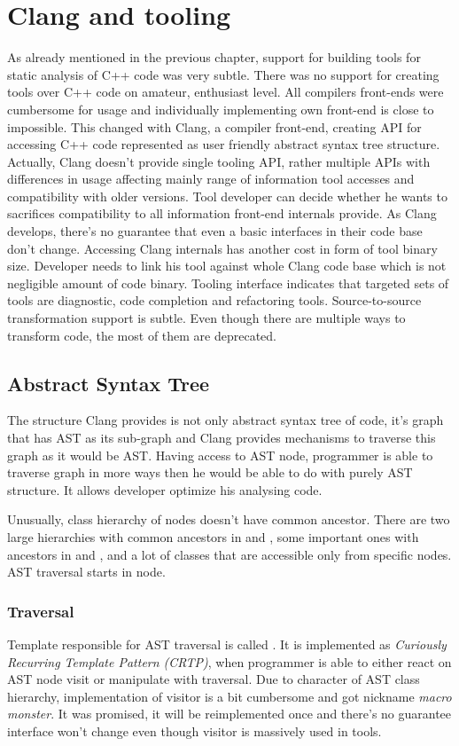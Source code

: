 \chapter{Clang and tooling}
As already mentioned in the previous chapter, support for building tools for static analysis of C++ code was very subtle. There was no support for creating tools over C++ code on amateur, enthusiast level. All compilers front-ends were cumbersome for usage and individually implementing own front-end is close to impossible. This changed with Clang, a compiler front-end, creating API for accessing C++ code represented as user friendly abstract syntax tree structure. Actually, Clang doesn't provide single tooling API, rather multiple APIs with differences in usage affecting mainly range of information tool accesses and compatibility with older versions. Tool developer can decide whether he wants to sacrifices compatibility to all information front-end internals provide. As Clang develops, there's no guarantee that even a basic interfaces in their code base don't change. Accessing Clang internals has another cost in form of tool binary size. Developer needs to link his tool against whole Clang code base which is not negligible amount of code binary. Tooling interface indicates that targeted sets of tools are diagnostic, code completion and refactoring tools. Source-to-source transformation support is subtle. Even though there are multiple ways to transform code, the most of them are deprecated.

\section{Abstract Syntax Tree}
The structure Clang provides is not only abstract syntax tree of code, it's graph that has AST as its sub-graph and Clang provides mechanisms to traverse this graph as it would be AST. Having access to AST node, programmer is able to traverse graph in more ways then he would be able to do with purely AST structure. It allows developer optimize his analysing code.

Unusually, class hierarchy of nodes doesn't have common ancestor. There are two large hierarchies with common ancestors in  and , some important ones with ancestors in  and , and a lot of classes that are accessible only from specific nodes. AST traversal starts in  node. 

\subsection{Traversal}
\label{clang-ast-traversal}
Template responsible for AST traversal is called . It is implemented as \emph{Curiously Recurring Template Pattern (CRTP)}, when programmer is able to either react on AST node visit or manipulate with traversal. Due to character of AST class hierarchy, implementation of visitor is a bit cumbersome and got nickname \emph{macro monster}. It was promised, it will be reimplemented once and there's no guarantee interface won't change even though visitor is massively used in tools.

